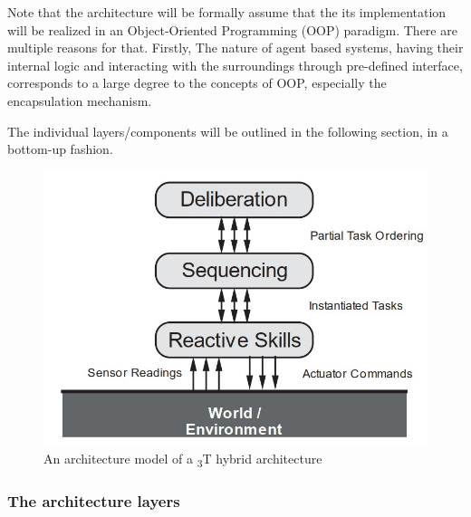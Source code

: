 \documentclass[main.tex]{subfiles}
\begin{document}
Note that the architecture will be formally assume that the its implementation will be realized 
in an Object-Oriented Programming (OOP) paradigm. There are multiple reasons for that. Firstly, 
The nature of agent based systems, having their internal logic and interacting with the surroundings 
through pre-defined interface, corresponds to a large degree to the concepts of OOP, especially
the encapsulation mechanism.


The individual layers/components will be outlined in the following section, in a bottom-up
fashion.

\begin{figure}[htbp]
    \centering
    \includegraphics[width=.8\textwidth]{3t-arch.jpg}
    \caption{An architecture model of a \textsubscript{3}T hybrid architecture \cite{Bonasso1995}}
    \label{3-arch2}
\end{figure}



\subsubsection{The architecture layers}
\end{document}
